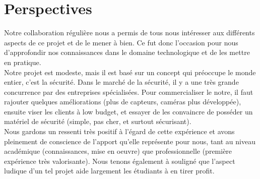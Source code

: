 \section{Perspectives} 

Notre collaboration régulière nous a permis de tous nous intéresser aux différents aspects de ce projet et de le mener à bien. Ce fut donc l'occasion pour nous d'approfondir nos connaissances dans le domaine technologique et de les mettre en pratique.\\

Notre projet est modeste, mais il est basé sur un concept qui préoccupe le monde entier, c'est la sécurité.
Dans le marché de la sécurité, il y a une très grande concurrence par des entreprises spécialisées. Pour commercialiser le notre, il faut rajouter quelques améliorations (plus de capteurs, caméras plus développée), ensuite viser les clients à low budget, et essayer de les convaincre de posséder un matériel de sécurité (simple, pas cher, et surtout sécurisant).\\


Nous gardons un ressenti très positif à l'égard de cette expérience et avons pleinement de conscience de l'apport qu'elle représente pour nous, tant au niveau académique (connaissances, mise en oeuvre) que professionnelle (première expérience très valorisante). Nous tenons également à souligné que l'aspect ludique d'un tel projet aide largement les étudiants à en tirer profit.
